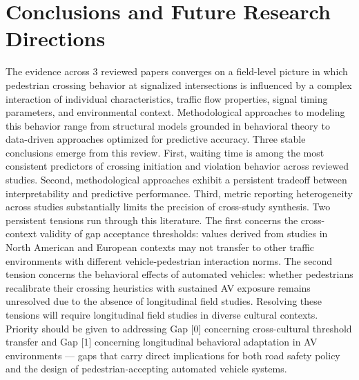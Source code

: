\documentclass{article}
\begin{document}
\section{Conclusions and Future Research Directions}
The evidence across 3 reviewed papers converges on a field-level picture in which pedestrian crossing behavior at signalized intersections is influenced by a complex interaction of individual characteristics, traffic flow properties, signal timing parameters, and environmental context. Methodological approaches to modeling this behavior range from structural models grounded in behavioral theory to data-driven approaches optimized for predictive accuracy. Three stable conclusions emerge from this review. First, waiting time is among the most consistent predictors of crossing initiation and violation behavior across reviewed studies. Second, methodological approaches exhibit a persistent tradeoff between interpretability and predictive performance. Third, metric reporting heterogeneity across studies substantially limits the precision of cross-study synthesis. Two persistent tensions run through this literature. The first concerns the cross-context validity of gap acceptance thresholds: values derived from studies in North American and European contexts may not transfer to other traffic environments with different vehicle-pedestrian interaction norms. The second tension concerns the behavioral effects of automated vehicles: whether pedestrians recalibrate their crossing heuristics with sustained AV exposure remains unresolved due to the absence of longitudinal field studies. Resolving these tensions will require longitudinal field studies in diverse cultural contexts. Priority should be given to addressing Gap [0] concerning cross-cultural threshold transfer and Gap [1] concerning longitudinal behavioral adaptation in AV environments — gaps that carry direct implications for both road safety policy and the design of pedestrian-accepting automated vehicle systems.
\end{document}
